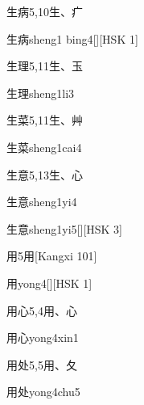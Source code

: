 \begin{entry}{生病}{5,10}{⽣、⽧}
  \begin{phonetics}{生病}{sheng1 bing4}[][HSK 1]
  \end{phonetics}
\end{entry}

\begin{entry}{生理}{5,11}{⽣、⽟}
  \begin{phonetics}{生理}{sheng1li3}
  \end{phonetics}
\end{entry}

\begin{entry}{生菜}{5,11}{⽣、⾋}
  \begin{phonetics}{生菜}{sheng1cai4}
  \end{phonetics}
\end{entry}

\begin{entry}{生意}{5,13}{⽣、⼼}
  \begin{phonetics}{生意}{sheng1yi4}
  \end{phonetics}
  \begin{phonetics}{生意}{sheng1yi5}[][HSK 3]
  \end{phonetics}
\end{entry}

\begin{entry}{用}{5}{⽤}[Kangxi 101]
  \begin{phonetics}{用}{yong4}[][HSK 1]
  \end{phonetics}
\end{entry}

\begin{entry}{用心}{5,4}{⽤、⼼}
  \begin{phonetics}{用心}{yong4xin1}
  \end{phonetics}
\end{entry}

\begin{entry}{用处}{5,5}{⽤、⼡}
  \begin{phonetics}{用处}{yong4chu5}
  \end{phonetics}
\end{entry}

